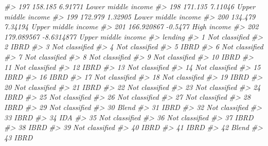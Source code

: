 \documentclass[
  xelatex, ja=standard]{bxjsbook}
\newenvironment{Shaded}{\begin{snugshade}}{\end{snugshade}}
\newcommand{\CommentTok}[1]{\textcolor[rgb]{0.56,0.35,0.01}{\textit{#1}}}
\theoremstyle{definition}
\theoremstyle{definition}
\theoremstyle{definition}
\theoremstyle{definition}
\theoremstyle{remark}
\begin{document}
\begin{Shaded}
\begin{Highlighting}[]
\CommentTok{\#\textgreater{} 197    158.185    6.91771 Lower middle income}
\CommentTok{\#\textgreater{} 198    171.135    7.11046 Upper middle income}
\CommentTok{\#\textgreater{} 199    172.979    1.32905 Lower middle income}
\CommentTok{\#\textgreater{} 200    134.479    7.34194 Upper middle income}
\CommentTok{\#\textgreater{} 201 166.920867    {-}0.5477         High income}
\CommentTok{\#\textgreater{} 202 179.089567 {-}8.6314877 Upper middle income}
\CommentTok{\#\textgreater{}            lending}
\CommentTok{\#\textgreater{} 1   Not classified}
\CommentTok{\#\textgreater{} 2             IBRD}
\CommentTok{\#\textgreater{} 3   Not classified}
\CommentTok{\#\textgreater{} 4   Not classified}
\CommentTok{\#\textgreater{} 5             IBRD}
\CommentTok{\#\textgreater{} 6   Not classified}
\CommentTok{\#\textgreater{} 7   Not classified}
\CommentTok{\#\textgreater{} 8   Not classified}
\CommentTok{\#\textgreater{} 9   Not classified}
\CommentTok{\#\textgreater{} 10            IBRD}
\CommentTok{\#\textgreater{} 11  Not classified}
\CommentTok{\#\textgreater{} 12            IBRD}
\CommentTok{\#\textgreater{} 13  Not classified}
\CommentTok{\#\textgreater{} 14  Not classified}
\CommentTok{\#\textgreater{} 15            IBRD}
\CommentTok{\#\textgreater{} 16            IBRD}
\CommentTok{\#\textgreater{} 17  Not classified}
\CommentTok{\#\textgreater{} 18  Not classified}
\CommentTok{\#\textgreater{} 19            IBRD}
\CommentTok{\#\textgreater{} 20  Not classified}
\CommentTok{\#\textgreater{} 21            IBRD}
\CommentTok{\#\textgreater{} 22  Not classified}
\CommentTok{\#\textgreater{} 23  Not classified}
\CommentTok{\#\textgreater{} 24            IBRD}
\CommentTok{\#\textgreater{} 25  Not classified}
\CommentTok{\#\textgreater{} 26  Not classified}
\CommentTok{\#\textgreater{} 27  Not classified}
\CommentTok{\#\textgreater{} 28            IBRD}
\CommentTok{\#\textgreater{} 29  Not classified}
\CommentTok{\#\textgreater{} 30           Blend}
\CommentTok{\#\textgreater{} 31            IBRD}
\CommentTok{\#\textgreater{} 32  Not classified}
\CommentTok{\#\textgreater{} 33            IBRD}
\CommentTok{\#\textgreater{} 34             IDA}
\CommentTok{\#\textgreater{} 35  Not classified}
\CommentTok{\#\textgreater{} 36  Not classified}
\CommentTok{\#\textgreater{} 37            IBRD}
\CommentTok{\#\textgreater{} 38            IBRD}
\CommentTok{\#\textgreater{} 39  Not classified}
\CommentTok{\#\textgreater{} 40            IBRD}
\CommentTok{\#\textgreater{} 41            IBRD}
\CommentTok{\#\textgreater{} 42           Blend}
\CommentTok{\#\textgreater{} 43            IBRD}

\end{Highlighting}
\end{Shaded}
\end{document}
